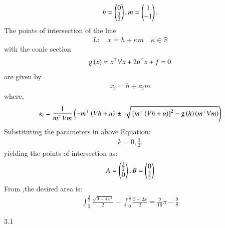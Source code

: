 \documentclass[journal]{IEEEtran}
\begin{document}
\begin{align}
    h=\begin{pmatrix}0\\ \frac{3}{2}\end{pmatrix},m=\begin{pmatrix}1\\-1\end{pmatrix}.
\end{align}
The points of intersection of the line 
\begin{align}
L: \quad x = h + \kappa m \quad \kappa \in \mathbb{R}
\label{eq:conic_tangent}
\end{align}
with the conic section \begin{align}
	\text{g}\left(x\right) = x^{\top}Vx+2u^{\top}x+f=0
    \end{align} are given by
\begin{align}
x_i = h + \kappa_im
	\label{eq:chord-pts}
\end{align}
where,
    \begin{multline}
\kappa_i = \frac{1}
{
m^{\top}Vm
}
\left(-m^{\top}\left(Vh+u\right)\right.
\pm
\left.\sqrt{
{}\left[
m^{\top}\left(Vh+u\right)
\right]^2
	-\text{g}
\left(h
\right)
\left(m^{\top}Vm\right)
}
\right)
\label{eq:app-tangent_roots}
\end{multline}
Substituting the parameters in above Equation:\\
\begin{align}
    k=0,\frac{3}{2}.
\end{align}
yielding the points of intersection as:\\
\begin{align}
    A=\begin{pmatrix}\frac{3}{2}\\0\end{pmatrix},B=\begin{pmatrix}0\\ \frac{3}{2}\end{pmatrix}
\end{align}
From ,the desired area is:\\
\begin{align}
\int_{0}^{\frac{3}{2}}\frac{\sqrt{9-4x^2}}{2}-\int_{0}^{\frac{3}{2}}\frac{3-2x}{2}=\frac{9}{16}\pi-\frac{9}{8}
\end{align}
\begin{table}[h]
    \centering
    
    \caption{3.1}
    \label{}
\end{table}
\end{document}
